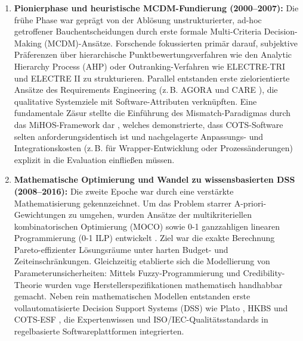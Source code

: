 \begin{enumerate}[label=\alph*)]
    \item \textbf{Pionierphase und heuristische MCDM-Fundierung (2000--2007):} Die frühe Phase war geprägt von der Ablösung unstrukturierter, ad-hoc getroffener Bauchentscheidungen durch erste formale Multi-Criteria Decision-Making (MCDM)-Ansätze. Forschende fokussierten primär darauf, subjektive Präferenzen über hierarchische Punktbewertungsverfahren wie den Analytic Hierarchy Process (AHP) \cite{DAU8NSK8, FCYW9EWJ} oder Outranking-Verfahren wie ELECTRE-TRI \cite{LZQJ6M4X} und ELECTRE II \cite{M3B2D3GD} zu strukturieren. Parallel entstanden erste zielorientierte Ansätze des Requirements Engineering (z.\,B. AGORA \cite{8XNYS4M9} und CARE \cite{6RNULWVY}), die qualitative Systemziele mit Software-Attributen verknüpften. Eine fundamentale Zäsur stellte die Einführung des Mismatch-Paradigmas durch das MiHOS-Framework dar \cite{MC9UMXZZ, 9F79VAAB}, welches demonstrierte, dass COTS-Software selten anforderungsidentisch ist und nachgelagerte Anpassungs- und Integrationskosten (z.\,B. für Wrapper-Entwicklung oder Prozessänderungen) explizit in die Evaluation einfließen müssen.

    \item \textbf{Mathematische Optimierung und Wandel zu wissensbasierten DSS (2008--2016):} Die zweite Epoche war durch eine verstärkte Mathematisierung gekennzeichnet. Um das Problem starrer A-priori-Gewichtungen zu umgehen, wurden Ansätze der multikriteriellen kombinatorischen Optimierung (MOCO) sowie 0-1 ganzzahligen linearen Programmierung (0-1 ILP) entwickelt \cite{ZQMG69VT, MZ8JHDYA, VUVLUN85}. Ziel war die exakte Berechnung Pareto-effizienter Lösungsräume unter harten Budget- und Zeiteinschränkungen. Gleichzeitig etablierte sich die Modellierung von Parameterunsicherheiten: Mittels Fuzzy-Programmierung und Credibility-Theorie \cite{6YJHIVHG, JX4RDRDU, B7ZTQCZZ} wurden vage Herstellerspezifikationen mathematisch handhabbar gemacht. Neben rein mathematischen Modellen entstanden erste vollautomatisierte Decision Support Systems (DSS) wie Plato \cite{8VHUMEKY}, HKBS \cite{U4E7VXQU} und COTS-ESF \cite{WZM7DUBY}, die Expertenwissen und ISO/IEC-Qualitätsstandards in regelbasierte Softwareplattformen integrierten.


\end{enumerate}
